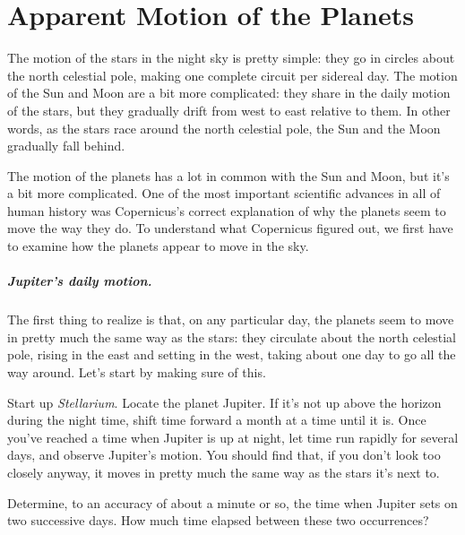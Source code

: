 \chapter{Apparent Motion of the Planets}

The motion of the stars in the night sky is pretty simple: they
go in circles about the north celestial pole, making one complete
circuit per sidereal day. The motion of the Sun and Moon are a bit
more complicated: they share in the daily motion of the stars, but
they gradually drift from west to east relative to them. In other words,
as the stars race around the north celestial pole, the Sun
and the Moon gradually fall behind.

The motion of the planets has a lot in common with the Sun and Moon,
but it's a bit more complicated. One of the most important scientific
advances in all of human history was Copernicus's correct
explanation of why the planets seem to move the way they do. 
To understand what Copernicus figured out, we first have
to examine how the planets appear to move in the sky.

\paragraph{Jupiter's daily motion.}
The first thing to realize is that, on any particular day, the
planets seem to move in pretty much the same way as the stars: they
circulate about the north celestial pole, rising in the east and setting
in the west, taking about one day to go all the way around. Let's start
by making sure of this.

Start up \textit{Stellarium}.
Locate the planet Jupiter. If it's not up above the horizon during the night
time, shift time forward a month at a time until it is. Once you've
reached a time when Jupiter is up at night,
let
time run rapidly for several days, 
and observe Jupiter's motion. You
should find that, if you don't look too closely anyway, it moves in
pretty much the same way as the stars it's next to.

Determine, to an accuracy of about a minute or so, the time when Jupiter sets
on two successive days. How much time elapsed between these two occurrences?

